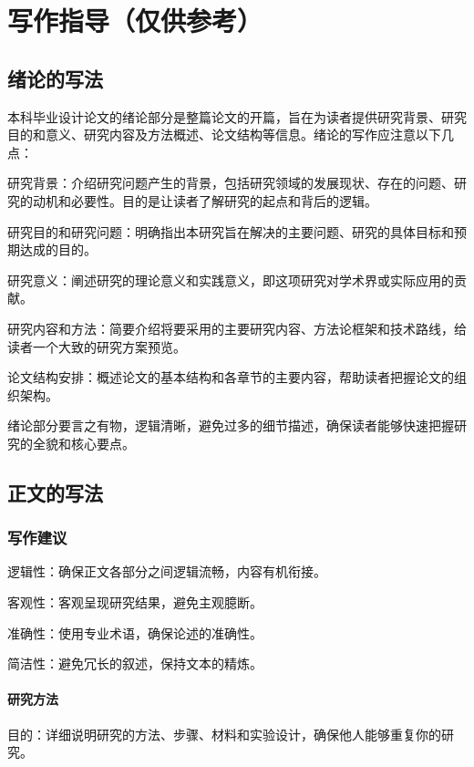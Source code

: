 \setcounter{page}{1}        %

\chapter{写作指导（仅供参考）}              %
\section{绪论的写法}     %

本科毕业设计论文的绪论部分是整篇论文的开篇，旨在为读者提供研究背景、研究目的和意义、研究内容及方法概述、论文结构等信息。绪论的写作应注意以下几点：

研究背景：介绍研究问题产生的背景，包括研究领域的发展现状、存在的问题、研究的动机和必要性。目的是让读者了解研究的起点和背后的逻辑。

研究目的和研究问题：明确指出本研究旨在解决的主要问题、研究的具体目标和预期达成的目的。

研究意义：阐述研究的理论意义和实践意义，即这项研究对学术界或实际应用的贡献。

研究内容和方法：简要介绍将要采用的主要研究内容、方法论框架和技术路线，给读者一个大致的研究方案预览。

论文结构安排：概述论文的基本结构和各章节的主要内容，帮助读者把握论文的组织架构。

绪论部分要言之有物，逻辑清晰，避免过多的细节描述，确保读者能够快速把握研究的全貌和核心要点。

\section{正文的写法}

\subsection{写作建议}

逻辑性：确保正文各部分之间逻辑流畅，内容有机衔接。

客观性：客观呈现研究结果，避免主观臆断。

准确性：使用专业术语，确保论述的准确性。

简洁性：避免冗长的叙述，保持文本的精炼。
\subsubsection{研究方法}
目的：详细说明研究的方法、步骤、材料和实验设计，确保他人能够重复你的研究。

